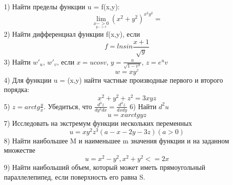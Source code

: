 \documentclass[a4paper,14pt]{extreport} %
\begin{document}
1) Найти пределы функции u = f(x,y):
$$ \lim_{\underset{y->e}{x->0}}(x^2 + y^2)^{x^2y^2}= $$
2) Найти дифференциал функции f(x,y), если
\[
  f = lnsin \frac{x+1}{\sqrt{y}}
\]
3) Найти $ w'_u $, $ w'_v $, если $x = ucosv$, $y = \frac{u}{\sqrt{1-v^2}}$, $z=e^uv$
\[
  w = xy^z
\]
4) Для функции u = (x,y) найти частные производные первого и второго порядка:
\[
 x^2+y^2+z^2 = 3xyz 
\]
5) $ z = arctg \frac{y}{x} $. Убедиться, что $\frac{d^3z}{dy^2dx} = \frac{d^3z}{dxdy}$
6) Найти $ d^2u $
\[
  u = xarctgyz
\]
7) Исследовать на экстремум функции нескольких переменных
\[
  u =xy^2z^3(a-x-2y-3z) (a > 0)
\]
8) Найти наибольшее M и наименьшее m значения функции и на заданном множестве
\[
  u = x^2 - y^2, x^2+y^2 <= 2x
\]
9) Найти наибольший объем, который может иметь прямоугольный параллелепипед, если поверхность его равна S.
\end{document}
